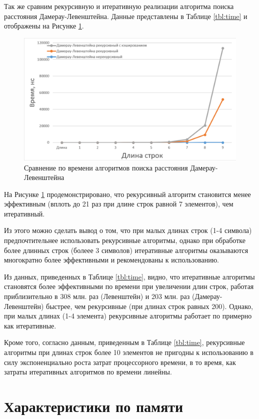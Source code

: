 \documentclass[a4paper,14pt, unknownkeysallowed]{bmstu}
\begin{document}
Так же сравним рекурсивную и итеративную реализации алгоритма поиска расстояния Дамерау-Левенштейна. Данные представлены в Таблице \ref{tbl:time} и отображены на Рисунке \ref{plt:time_02}.

\begin{figure}[h]
	\centering
	\includegraphics[height=0.3\textheight]{img/diag_02.png}
	\caption{Сравнение по времени алгоритмов поиска расстояния Дамерау-Левенштейна}
	\label{plt:time_02}
\end{figure}

На Рисунке \ref{plt:time_02} продемонстрировано, что рекурсивный алгоритм становится менее эффективным (вплоть до 21 раз при длине строк равной 7 элементов), чем итеративный.

Из этого можно сделать вывод о том, что при малых длинах строк (1-4 символа) предпочтительнее использовать рекурсивные алгоритмы, однако при обработке более длинных строк (болеее 3 символов) итеративные алгоритмы оказываются многократно более эффективными и рекомендованы к использованию.

Из данных, приведенных в  Таблице \ref{tbl:time}, видно, что итеративные алгоритмы становятся более эффективными по времени при увеличении длин строк, работая приблизительно в 308 млн. раз (Левенштейн) и 203 млн. раз (Дамерау-Левенштейн) быстрее, чем рекурсивные (при длинах строк равных 200). Однако, при малых длинах (1-4 элемента) рекурсивные алгоритмы работает по примерно как итеративные.

Кроме того, согласно данным, приведенным в Таблице \ref{tbl:time}, рекурсивные алгоритмы при длинах строк более 10 элементов не пригодны к использованию в силу экспоненциально роста затрат процессорного времени, в то время, как затраты итеративных алгоритмов по времени линейны.

\section{Характеристики по памяти}
\end{document}
